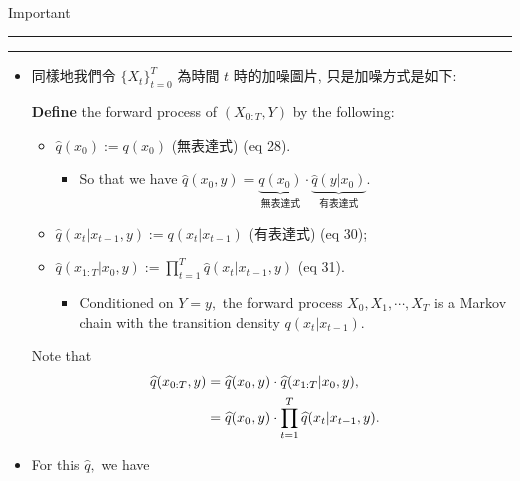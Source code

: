 \documentclass[
]{article}
\makeatletter
\let\oldparagraph\paragraph
\renewcommand{\paragraph}{
    \@ifstar
      \xxxParagraphStar
      \xxxParagraphNoStar
  }
\newcommand{\xxxParagraphStar}[1]{\oldparagraph*{#1}\mbox{}}
\newcommand{\xxxParagraphNoStar}[1]{\oldparagraph{#1}\mbox{}}
\providecommand{\tightlist}{%
  \setlength{\itemsep}{0pt}\setlength{\parskip}{0pt}}\usepackage{longtable,booktabs,array}
\theoremstyle{remark}
\makeatother
\begin{document}
\paragraph{Important}\label{important}

\begin{center}\rule{0.5\linewidth}{0.5pt}\end{center}

\begin{center}\rule{0.5\linewidth}{0.5pt}\end{center}

\begin{itemize}
\item
  同樣地我們令 \(\lbrace X_t \rbrace_{t=0}^T\) 為時間 \(t\)
  時的加噪圖片, 只是加噪方式是如下:

  \textbf{Define} the forward process of \((X_{0:T},Y)\) by the
  following:

  \begin{itemize}
  \tightlist
  \item
    \(\widehat{q}(x_0):= q(x_0)\) (無表達式) (eq 28).

    \begin{itemize}
    \tightlist
    \item
      So that we have
      \(\widehat{q}(x_0,y)=\underbrace{q(x_0)}_{\text{無表達式}} \cdot \underbrace{\widehat{q}(y\vert x_0)}_{\text{有表達式}}.\)
    \end{itemize}
  \item
    \(\widehat{q}(x_t\vert x_{t-1},y):= q(x_{t}\vert x_{t-1})\)
    (有表達式) (eq 30);
  \item
    \(\widehat{q}(x_{1:T}\vert x_0,y):= \prod_{t=1}^T \widehat{q}(x_t\vert x_{t-1},y)\)
    (eq 31).

    \begin{itemize}
    \tightlist
    \item
      Conditioned on \(Y=y,\) the forward process \(X_0,X_1,\cdots,X_T\)
      is a Markov chain with the transition density
      \(q(x_t\vert x_{t-1}).\)
    \end{itemize}
  \end{itemize}

  Note that \[
  \begin{aligned}
    \widehat{q}(x_{0:T},y)
    &= \widehat{q}(x_0,y) \cdot \widehat{q}(x_{1:T}\vert x_0,y), \cr 
    &= \widehat{q}(x_0,y) \cdot \prod_{t=1}^T \widehat{q}(x_t\vert x_{t-1},y).
  \end{aligned}
  \]
\item
  For this \(\widehat{q},\) we have


\end{itemize}
\end{document}
